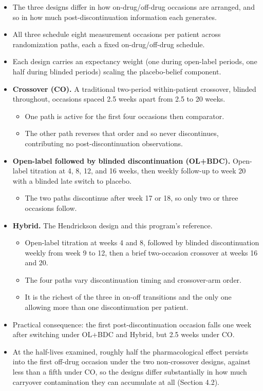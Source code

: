 \documentclass[
  11pt,
]{article}
\providecommand{\tightlist}{%
  \setlength{\itemsep}{0pt}\setlength{\parskip}{0pt}}
\begin{document}
\begin{itemize}
\tightlist
\item
  The three designs differ in how on-drug/off-drug occasions are
  arranged, and so in how much post-discontinuation information each
  generates.
\item
  All three schedule eight measurement occasions per patient across
  randomization paths, each a fixed on-drug/off-drug schedule.
\item
  Each design carries an expectancy weight (one during open-label
  periods, one half during blinded periods) scaling the
  placebo-belief component.
\item
  \textbf{Crossover (CO).} A traditional two-period within-patient
  crossover, blinded throughout, occasions spaced 2.5 weeks apart
  from 2.5 to 20 weeks.

  \begin{itemize}
  \tightlist
  \item
    One path is active for the first four occasions then comparator.
  \item
    The other path reverses that order and so never discontinues,
    contributing no post-discontinuation observations.
  \end{itemize}
\item
  \textbf{Open-label followed by blinded discontinuation (OL+BDC).}
  Open-label titration at 4, 8, 12, and 16 weeks, then weekly
  follow-up to week 20 with a blinded late switch to placebo.

  \begin{itemize}
  \tightlist
  \item
    The two paths discontinue after week 17 or 18, so only two or
    three occasions follow.
  \end{itemize}
\item
  \textbf{Hybrid.} The Hendrickson design and this program's reference.

  \begin{itemize}
  \tightlist
  \item
    Open-label titration at weeks 4 and 8, followed by blinded
    discontinuation weekly from week 9 to 12, then a brief
    two-occasion crossover at weeks 16 and 20.
  \item
    The four paths vary discontinuation timing and crossover-arm
    order.
  \item
    It is the richest of the three in on-off transitions and the only
    one allowing more than one discontinuation per patient.
  \end{itemize}
\item
  Practical consequence: the first post-discontinuation occasion
  falls one week after switching under OL+BDC and Hybrid, but 2.5
  weeks under CO.
\item
  At the half-lives examined, roughly half the pharmacological effect
  persists into the first off-drug occasion under the two
  non-crossover designs, against less than a fifth under CO, so the
  designs differ substantially in how much carryover contamination
  they can accumulate at all (Section 4.2).
\end{itemize}
\end{document}
